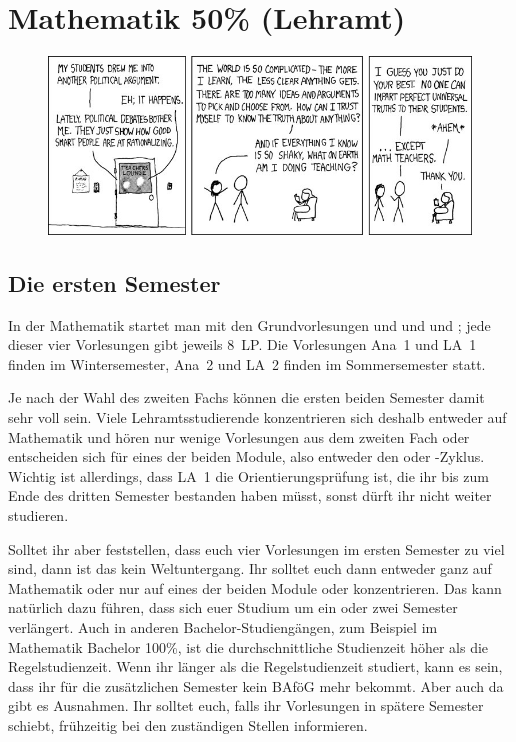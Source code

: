 \section{Mathematik 50\% (Lehramt)}

\begin{figure}[b]
\centering
\includegraphics[width=\textwidth]{bilder/certainty.jpg}
\end{figure}

\subsection{Die ersten Semester}

In der Mathematik startet man mit den Grundvorlesungen  und  und  und ; jede dieser vier Vorlesungen gibt jeweils 8~\gls{LP}. Die Vorlesungen \gls{Ana}~1 und \gls{LA}~1 finden im Wintersemester, \gls{Ana}~2 und \gls{LA}~2 finden im Sommersemester statt. 

Je nach der Wahl des zweiten Fachs können die ersten beiden Semester damit sehr voll sein. Viele Lehramtsstudierende konzentrieren sich deshalb entweder auf Mathematik und hören nur wenige Vorlesungen aus dem zweiten Fach oder entscheiden sich für eines der beiden Module, also entweder den  oder -Zyklus. Wichtig ist allerdings, dass \gls{LA}~1 die Orientierungsprüfung ist, die ihr bis zum Ende des dritten Semester bestanden haben müsst, sonst dürft ihr nicht weiter studieren.

Solltet ihr aber feststellen, dass euch vier Vorlesungen im ersten Semester zu viel sind, dann ist das kein Weltuntergang. Ihr solltet euch dann entweder ganz auf Mathematik oder nur auf eines der beiden Module  oder  konzentrieren. Das kann natürlich dazu führen, dass sich euer Studium um ein oder zwei Semester verlängert. Auch in anderen Bachelor-Studiengängen, zum Beispiel im Mathematik Bachelor 100\%, ist die durchschnittliche Studienzeit höher als die Regelstudienzeit. Wenn ihr länger als die Regelstudienzeit studiert, kann es sein, dass ihr für die zusätzlichen Semester kein BAföG mehr bekommt. Aber auch da gibt es Ausnahmen. Ihr solltet euch, falls ihr Vorlesungen in spätere Semester schiebt, frühzeitig bei den zuständigen Stellen informieren.

